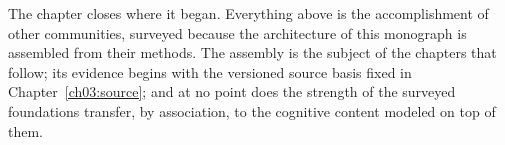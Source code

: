 The chapter closes where it began. Everything above is the
accomplishment of other communities, surveyed because the architecture
of this monograph is assembled from their methods. The assembly is the
subject of the chapters that follow; its evidence begins with the
versioned source basis fixed in Chapter~\ref{ch03:source}; and at no
point does the strength of the surveyed foundations transfer, by
association, to the cognitive content modeled on top of them.
